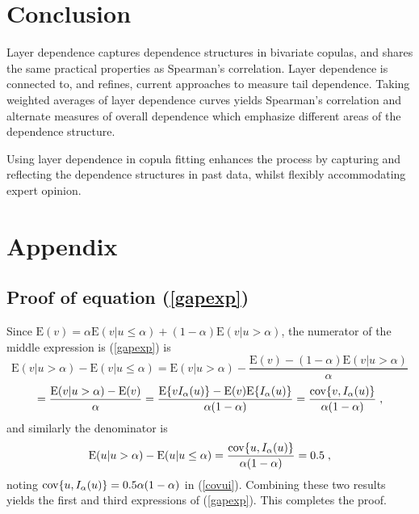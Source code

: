 \documentclass[authoryear]{elsarticle}
\newcommand{\cov}{{\rm cov}}
\newcommand{\E}{{\mathrm E}}
\newcommand{\eref}[1]{(\ref{#1})}
\begin{document}
\section{Conclusion}\label{sconclusion}

Layer dependence captures dependence structures in bivariate copulas, and shares the same practical properties as Spearman's correlation. Layer dependence is connected to, and refines, current approaches to measure tail dependence. Taking weighted averages of layer dependence curves yields Spearman's correlation and alternate measures of overall dependence which emphasize different areas of the dependence structure.

Using layer dependence in copula fitting enhances the process by capturing and reflecting the dependence structures in past data, whilst flexibly accommodating expert opinion.

\newpage

\newpage

\section{Appendix}


\subsection{Proof of equation \eref{gapexp}}

Since $\E(v)=\alpha\E(v|u\le\alpha)+(1-\alpha)\E(v|u>\alpha)$, the numerator of the middle expression is \eref{gapexp} is
$$
\E(v|u>\alpha)-\E(v|u\leq \alpha) = \E(v|u>\alpha)- \frac{\E(v)-(1-\alpha)\E(v|u>\alpha)}{\alpha}
$$
$$
= \frac{\E(v|u>\alpha)-\E(v)}{\alpha}
= \frac{\E\{vI_\alpha(u)\}-\E(v)\E\{I_\alpha(u)\}}{\alpha(1-\alpha)}
= \frac{\cov\{v,I_\alpha(u)\}}{\alpha(1-\alpha)} \;,
$$
and similarly the denominator is
$$
\E(u|u>\alpha)-\E(u|u\leq \alpha) = \frac{\cov\{u,I_\alpha(u)\}}{\alpha(1-\alpha)} = 0.5 \;,
$$
noting $\cov\{u,I_\alpha(u)\}=0.5\alpha(1-\alpha)$ in \eref{covui}. Combining these two results yields the first and third expressions of \eref{gapexp}. This completes the proof.
\end{document}
